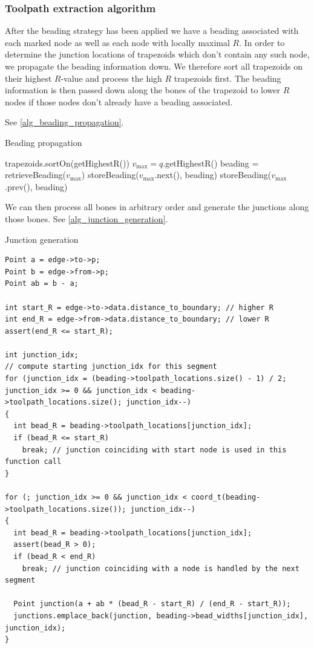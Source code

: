 \subsubsection{Toolpath extraction algorithm}
After the beading strategy has been applied we have a beading associated with each marked node as well as each node with locally maximal $R$.
In order to determine the junction locations of trapezoids which don't contain any such node, we propagate the beading information down.
We therefore sort all trapezoids on their highest $R$-value and process the high $R$ trapezoids first.
The beading information is then passed down along the bones of the trapezoid to lower $R$ nodes if those nodes don't already have a beading associated.

See \cref{alg_beading_propagation}.

\begin{algorithm}
\caption{Beading propagation}
\label{alg_beading_propagation}
\begin{algorithmic}
\State trapezoids.sortOn(getHighestR())
	\State $v_\text{max} = q$.getHighestR()
	\State beading = retrieveBeading($v_\text{max}$)
		\State storeBeading($v_\text{max}$.next(), beading)
	\EndIf
		\State storeBeading($v_\text{max}$.prev(), beading)
	\EndIf
\EndFor
\end{algorithmic}
\end{algorithm}


We can then process all bones in arbitrary order and generate the junctions along those bones.
See \cref{alg_junction_generation}.

\begin{algorithm}
\caption{Junction generation}
\label{alg_junction_generation}
\lstset{language=C++}
\begin{lstlisting}[frame=single]
Point a = edge->to->p;
Point b = edge->from->p;
Point ab = b - a;

int start_R = edge->to->data.distance_to_boundary; // higher R
int end_R = edge->from->data.distance_to_boundary; // lower R
assert(end_R <= start_R);

int junction_idx;
// compute starting junction_idx for this segment
for (junction_idx = (beading->toolpath_locations.size() - 1) / 2; junction_idx >= 0 && junction_idx < beading->toolpath_locations.size(); junction_idx--)
{
  int bead_R = beading->toolpath_locations[junction_idx];
  if (bead_R <= start_R)
    break; // junction coinciding with start node is used in this function call
}

for (; junction_idx >= 0 && junction_idx < coord_t(beading->toolpath_locations.size()); junction_idx--)
{
  int bead_R = beading->toolpath_locations[junction_idx];
  assert(bead_R > 0);
  if (bead_R < end_R)
    break; // junction coinciding with a node is handled by the next segment
  
  Point junction(a + ab * (bead_R - start_R) / (end_R - start_R));
  junctions.emplace_back(junction, beading->bead_widths[junction_idx], junction_idx);
}
\end{lstlisting}
\end{algorithm}


